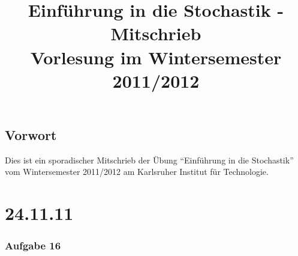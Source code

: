 \documentclass[a4paper,11pt,notitlepage]{report}
\title{\textbf{{Einführung in die Stochastik - Mitschrieb} \\[5ex] 
    {\Large Vorlesung im Wintersemester 2011/2012\\[5ex]}}}
\author{\myname{Sarah Lutteropp}}
\begin{document}
\maketitle
\setcounter{tocdepth}{1}
\tableofcontents

\section*{Vorwort}
Dies ist ein sporadischer Mitschrieb der Übung “Einführung in die Stochastik” vom Wintersemester 2011/2012 am Karlsruher Institut für Technologie.

\chapter{24.11.11}

\subsection{Aufgabe 16}
\end{document}
